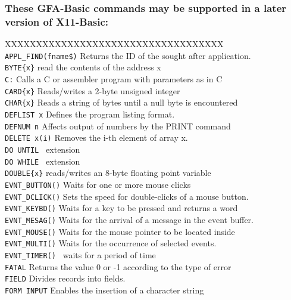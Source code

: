 \subsubsection*{These GFA-Basic commands may be supported in a later version of 
X11-Basic:}

\begin{tabbing}
XXXXXXXXXXXXXXXXX\=XXXXXXXXXXXXXXXXXX\=\kill\\
\verb|APPL_FIND(fname$)|\> Returns the ID of the sought after application.\\
\verb|BYTE{x}|\>		read the contents of the address x\\
\verb|C:|\>	      Calls a C or assembler program with parameters as in C\\
\verb|CARD{x}|\>	      Reads/writes a 2-byte unsigned integer\\
\verb|CHAR{x}|\>	      Reads a string of bytes until a null byte is  encountered\\
\verb|DEFLIST x|\>       Defines the program listing format.\\
\verb|DEFNUM n|\>        Affects  output  of numbers by the PRINT  command\\
\verb|DELETE x(i)|\>     Removes  the i-th element of array x.\\
\verb|DO UNTIL |\>      extension\\
\verb|DO WHILE |\>      extension\\
\verb|DOUBLE{x}|\>       reads/writes  an  8-byte floating point  variable\\
\verb|EVNT_BUTTON()|\>   Waits for one or more mouse clicks\\
\verb|EVNT_DCLICK()|\>   Sets the speed for double-clicks of a mouse button.\\
\verb|EVNT_KEYBD()|\>    Waits for  a key to be pressed and  returns  a  word\\
\verb|EVNT_MESAG()|\>    Waits for the arrival of a message in the event buffer.\\
\verb|EVNT_MOUSE()|\>    Waits for  the  mouse pointer to  be  located  inside \\
\verb|EVNT_MULTI()|\>    Waits for the occurrence of selected  events.\\
\verb|EVNT_TIMER() |\>   waits for a period  of  time\\
\verb|FATAL|\>	      Returns the value 0 or -1 according to the type of error\\
\verb|FIELD|\>	      Divides records into fields.\\
\verb|FORM INPUT|\>      Enables the insertion of a character string\\

\end{tabbing}
